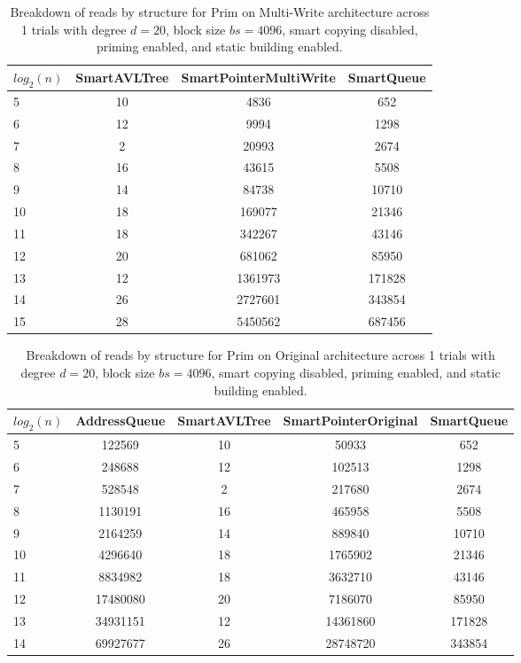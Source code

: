 \begin{table}[]
\centering
\begin{tabular}{|l|c|c|c|}
$log_2(n)$ & SmartAVLTree & SmartPointerMultiWrite & SmartQueue \\ \hline
5 & 10 & 4836 & 652 \\ \hline
6 & 12 & 9994 & 1298 \\ \hline
7 & 2 & 20993 & 2674 \\ \hline
8 & 16 & 43615 & 5508 \\ \hline
9 & 14 & 84738 & 10710 \\ \hline
10 & 18 & 169077 & 21346 \\ \hline
11 & 18 & 342267 & 43146 \\ \hline
12 & 20 & 681062 & 85950 \\ \hline
13 & 12 & 1361973 & 171828 \\ \hline
14 & 26 & 2727601 & 343854 \\ \hline
15 & 28 & 5450562 & 687456 \\ \hline
\end{tabular}
\caption{Breakdown of reads by structure for Prim on Multi-Write architecture across 1 trials with degree $d=20$, block size $bs=4096$, smart copying disabled, priming enabled, and static building enabled.}
    \label{tab:reads_by_structure_prim_d20_bs4096_trials1_copiesfalse_primetrue_staticinsertiontrue_ptmultiwrite_movetrue}
\end{table}

\begin{table}[]
\centering
\begin{tabular}{|l|c|c|c|c|}
$log_2(n)$ & AddressQueue & SmartAVLTree & SmartPointerOriginal & SmartQueue \\ \hline
5 & 122569 & 10 & 50933 & 652 \\ \hline
6 & 248688 & 12 & 102513 & 1298 \\ \hline
7 & 528548 & 2 & 217680 & 2674 \\ \hline
8 & 1130191 & 16 & 465958 & 5508 \\ \hline
9 & 2164259 & 14 & 889840 & 10710 \\ \hline
10 & 4296640 & 18 & 1765902 & 21346 \\ \hline
11 & 8834982 & 18 & 3632710 & 43146 \\ \hline
12 & 17480080 & 20 & 7186070 & 85950 \\ \hline
13 & 34931151 & 12 & 14361860 & 171828 \\ \hline
14 & 69927677 & 26 & 28748720 & 343854 \\ \hline
\end{tabular}
\caption{Breakdown of reads by structure for Prim on Original architecture across 1 trials with degree $d=20$, block size $bs=4096$, smart copying disabled, priming enabled, and static building enabled.}
    \label{tab:reads_by_structure_prim_d20_bs4096_trials1_copiesfalse_primetrue_staticinsertiontrue_ptoriginal_movefalse}
\end{table}

